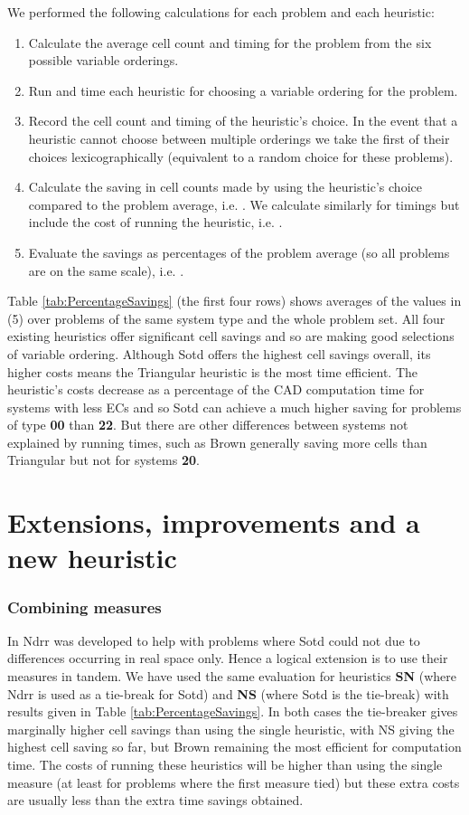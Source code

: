 \documentclass[runningheads,a4paper]{llncs}
\begin{document}
We performed the following calculations for each problem and each heuristic:
\begin{enumerate}
\item Calculate the average cell count and timing for the problem from the six possible variable orderings.
\item Run and time each heuristic for choosing a variable ordering for the problem.
\item Record the cell count and timing of the heuristic's choice.  In the event that a heuristic cannot choose between multiple orderings we take the first of their choices lexicographically (equivalent to a random choice for these problems).  
\item Calculate the saving in cell counts made by using the heuristic's choice compared to the problem average, i.e. .  
We calculate similarly for timings but include the cost of running the heuristic, i.e. .
\item Evaluate the savings as percentages of the problem average (so all problems are on the same scale), i.e. .
\end{enumerate}
Table \ref{tab:PercentageSavings} (the first four rows) shows averages of the values in (5) over problems of the same system type and the whole problem set.  All four existing heuristics offer significant cell savings and so are making good selections of variable ordering.  Although Sotd offers the highest cell savings overall, its higher costs means the Triangular heuristic is the most time efficient.
The heuristic's costs decrease as a percentage of the CAD computation time for systems with less ECs and so Sotd can achieve a much higher saving for problems of type \textbf{00} than \textbf{22}.  But there are other differences between systems not explained by running times, such as Brown generally saving more cells than Triangular but not for systems \textbf{20}.

\section{Extensions, improvements and a new heuristic}
\label{SEC:New}

\subsubsection*{Combining measures}

In \cite{BDEW13} Ndrr was developed to help with problems where Sotd could not due to differences occurring in real space only.  Hence a logical extension is to use their measures in tandem.  We have used the same evaluation for heuristics \textbf{SN} (where Ndrr is used as a tie-break for Sotd) and \textbf{NS} (where Sotd is the tie-break) with results given in Table \ref{tab:PercentageSavings}.
In both cases the tie-breaker gives marginally higher cell savings than using the single heuristic, with NS giving the highest cell saving so far, but Brown remaining the most efficient for computation time.  The costs of running these heuristics will be higher than using the single measure (at least for problems where the first measure tied) but these extra costs are usually less than the extra time savings obtained.
\end{document}
